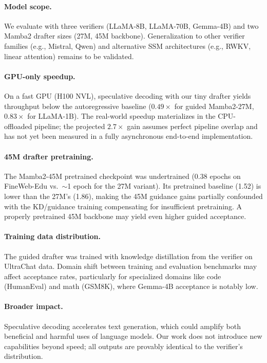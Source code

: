 \paragraph{Model scope.}
We evaluate with three verifiers (LLaMA-8B, LLaMA-70B, Gemma-4B) and two Mamba2 drafter sizes (27M, 45M backbone).
Generalization to other verifier families (e.g., Mistral, Qwen) and alternative SSM architectures (e.g., RWKV, linear attention) remains to be validated.

\paragraph{GPU-only speedup.}
On a fast GPU (H100 NVL), speculative decoding with our tiny drafter yields throughput below the autoregressive baseline ($0.49\times$ for guided Mamba2-27M, $0.83\times$ for LLaMA-1B).
The real-world speedup materializes in the CPU-offloaded pipeline; the projected $2.7{\times}$ gain assumes perfect pipeline overlap and has not yet been measured in a fully asynchronous end-to-end implementation.

\paragraph{45M drafter pretraining.}
The Mamba2-45M pretrained checkpoint was undertrained (0.38 epochs on FineWeb-Edu vs.\ $\sim$1 epoch for the 27M variant).
Its pretrained baseline (1.52) is lower than the 27M's (1.86), making the 45M guidance gains partially confounded with the KD/guidance training compensating for insufficient pretraining.
A properly pretrained 45M backbone may yield even higher guided acceptance.

\paragraph{Training data distribution.}
The guided drafter was trained with knowledge distillation from the verifier on UltraChat data.
Domain shift between training and evaluation benchmarks may affect acceptance rates, particularly for specialized domains like code (HumanEval) and math (GSM8K), where Gemma-4B acceptance is notably low.

\paragraph{Broader impact.}
Speculative decoding accelerates text generation, which could amplify both beneficial and harmful uses of language models.
Our work does not introduce new capabilities beyond speed; all outputs are provably identical to the verifier's distribution.
